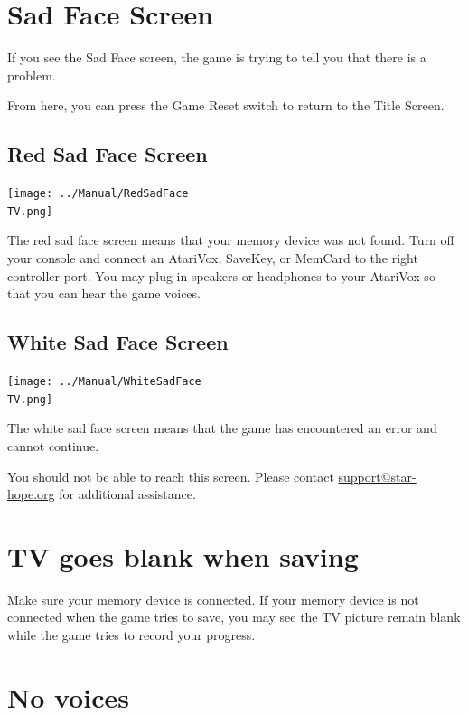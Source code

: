\documentclass[10pt,twocolumn,openany,article]{memoir}
\newcommand\TV{NTSC}
\newcommand\TV{PAL}
\newcommand\TV{SECAM}
\begin{document}
\begin{description}
\fi

\section{Sad Face Screen}

If you  see the Sad  Face screen,  the game is  trying to tell  you that
there is a problem.

From  here,  you can  press  the  Game Reset  switch  to  return to  the
Title Screen.

\subsection{Red Sad Face Screen}

\texttt{[image: ../Manual/RedSadFace\\TV.png]}

The red  sad face screen  means that your  memory device was  not found.
Turn off  your console and connect  an AtariVox, SaveKey, or  MemCard to
the right  controller port. You  may plug  in speakers or  headphones to
your AtariVox so that you can hear the game voices.

\subsection{White Sad Face Screen}

\texttt{[image: ../Manual/WhiteSadFace\\TV.png]}

The white sad  face screen means that the game  has encountered an error
and cannot continue. 

You  should   not  be  able   to  reach  this  screen.   Please  contact
\href{mailto:support@star-hope.org}{support@star-hope.org}           for
additional assistance.


\section{TV goes blank when saving}

Make sure your memory device is  connected. If your memory device is not
connected when the game tries to save, you may see the TV picture remain
blank while the game tries to record your progress.

\section{No voices}


\end{description}
\end{document}
